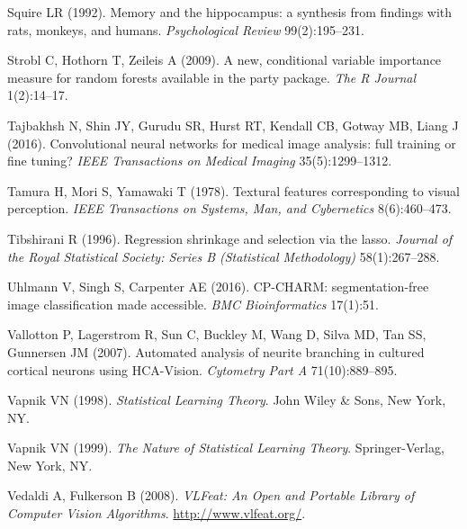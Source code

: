 \begin{thebibliography}{110}
Squire LR (1992). Memory and the hippocampus: a synthesis from findings with
  rats, monkeys, and humans. \emph{Psychological Review} 99(2):195--231.

Strobl C, Hothorn T, Zeileis A (2009). A new, conditional variable importance
  measure for random forests available in the party package. \emph{The R
  Journal} 1(2):14--17.

Tajbakhsh N, Shin JY, Gurudu SR, Hurst RT, Kendall CB, Gotway MB, Liang J
  (2016). Convolutional neural networks for medical image analysis: full
  training or fine tuning? \emph{IEEE Transactions on Medical Imaging}
  35(5):1299--1312.

Tamura H, Mori S, Yamawaki T (1978). Textural features corresponding to visual
  perception. \emph{IEEE Transactions on Systems, Man, and Cybernetics}
  8(6):460--473.

Tibshirani R (1996). Regression shrinkage and selection via the lasso.
  \emph{Journal of the Royal Statistical Society: Series B (Statistical
  Methodology)} 58(1):267--288.

Uhlmann V, Singh S, Carpenter AE (2016). {CP-CHARM}: segmentation-free image
  classification made accessible. \emph{BMC Bioinformatics} 17(1):51.

Vallotton P, Lagerstrom R, Sun C, Buckley M, Wang D, Silva MD, Tan SS,
  Gunnersen JM (2007). Automated analysis of neurite branching in cultured
  cortical neurons using {HCA-Vision}. \emph{Cytometry Part A} 71(10):889--895.

Vapnik VN (1998). \emph{Statistical Learning Theory}. John Wiley \& Sons, New
  York, NY.

Vapnik VN (1999). \emph{The Nature of Statistical Learning Theory}.
  Springer-Verlag, New York, NY.

Vedaldi A, Fulkerson B (2008).
\newblock \emph{{VLFeat}: An Open and Portable Library of Computer Vision
  Algorithms}. \urlprefix\url{http://www.vlfeat.org/}.


\end{thebibliography}
